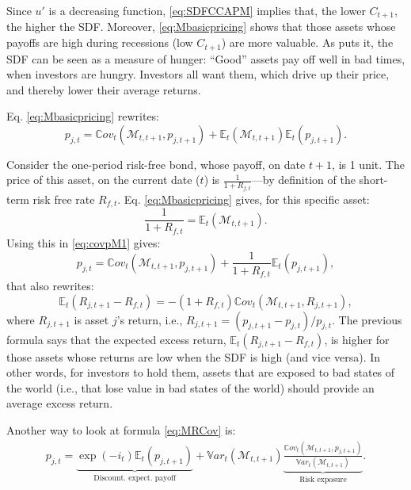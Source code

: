 \documentclass[
  12pt,
]{book}
\theoremstyle{definition}
\theoremstyle{definition}
\theoremstyle{definition}
\theoremstyle{definition}
\theoremstyle{remark}
\begin{document}
Since \(u'\) is a decreasing function, \eqref{eq:SDFCCAPM} implies that, the lower \(C_{t+1}\), the higher the SDF. Moreover, \eqref{eq:Mbasicpricing} shows that those assets whose payoffs are high during recessions (low \(C_{t+1}\)) are more valuable. As \citet{Cochrane_2005} puts it, the SDF can be seen as a measure of hunger: ``Good'' assets pay off well in bad times, when investors are hungry. Investors all want them, which drive up their price, and thereby lower their average returns.

Eq. \eqref{eq:Mbasicpricing} rewrites:
\begin{equation}
p_{j,t} = \mathbb{C}ov_t(\mathcal{M}_{t,t+1},p_{j,t+1}) +\mathbb{E}_t(\mathcal{M}_{t,t+1})\mathbb{E}_t(p_{j,t+1}).\label{eq:covpM1}
\end{equation}

Consider the one-period risk-free bond, whose payoff, on date \(t+1\), is 1 unit. The price of this asset, on the current date (\(t\)) is \(\frac{1}{1+R_{f,t}}\)---by definition of the short-term risk free rate \(R_{f,t}\). Eq. \eqref{eq:Mbasicpricing} gives, for this specific asset:
\[
\frac{1}{1+R_{f,t}} = \mathbb{E}_t(\mathcal{M}_{t,t+1}).
\]
Using this in \eqref{eq:covpM1} gives:
\begin{equation}
p_{j,t} = \mathbb{C}ov_t(\mathcal{M}_{t,t+1},p_{j,t+1}) +\frac{1}{1+R_{f,t}}\mathbb{E}_t(p_{j,t+1}),\label{eq:covpM2}
\end{equation}
that also rewrites:
\begin{equation}
\boxed{\mathbb{E}_t(R_{j,t+1} - R_{f,t}) = - (1 + R_{f,t}) \mathbb{C}ov_t(\mathcal{M}_{t,t+1},R_{j,t+1}),}\label{eq:MRCov}
\end{equation}
where \(R_{j,t+1}\) is asset \(j\)'s return, i.e., \(R_{j,t+1} = (p_{j,t+1} - p_{j,t})/p_{j,t}\). The previous formula says that the expected excess return, \(\mathbb{E}_t(R_{j,t+1} - R_{f,t})\), is higher for those assets whose returns are low when the SDF is high (and vice versa). In other words, for investors to hold them, assets that are exposed to bad states of the world (i.e., that lose value in bad states of the world) should provide an average excess return.

Another way to look at formula \eqref{eq:MRCov} is:
\begin{eqnarray*}
p_{j,t} = \underbrace{\exp(-i_t) \mathbb{E}_t(p_{j,t+1})}_{\mbox{Discount.  expect. payoff}} + \mathbb{V}ar_t(\mathcal{M}_{t,t+1}) \underbrace{\frac{\mathbb{C}ov_t(\mathcal{M}_{t,t+1},p_{j,t+1})}{\mathbb{V}ar_t(\mathcal{M}_{t,t+1})}}_{\mbox{Risk exposure}}.
\end{eqnarray*}
\end{document}
